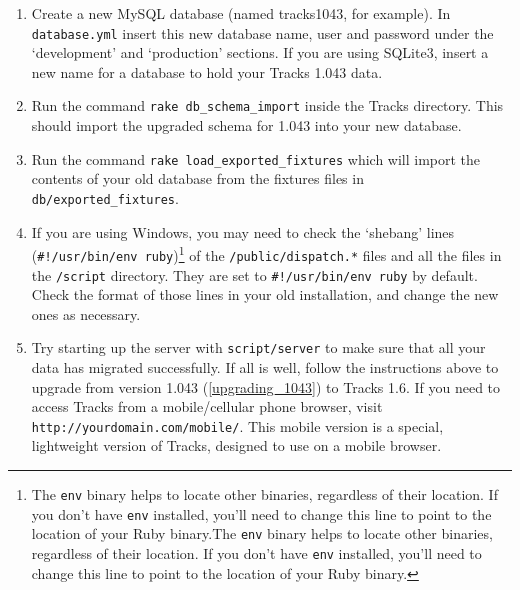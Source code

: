 \documentclass[10pt,twoside]{memoir}
\def\mybibliostyle{plain}
\def\bibliocommand{}
\begin{document}
\begin{enumerate}
\item Create a new MySQL database (named tracks1043, for example). In \texttt{database.yml} insert this new database name, user and password under the `development' and `production' sections. If you are using SQLite3, insert a new name for a database to hold your Tracks 1.043 data.

\item Run the command \texttt{rake db\_schema\_import} inside the Tracks directory. This should import the upgraded schema for 1.043 into your new database.

\item Run the command \texttt{rake load\_exported\_fixtures} which will import the contents of your old database from the fixtures files in \texttt{db/exported\_fixtures}.

\item If you are using Windows, you may need to check the `shebang' lines (\texttt{\#!/usr/bin/env ruby})\footnote{The \texttt{env} binary helps to locate other binaries, regardless of their location. If you don't have \texttt{env} installed, you'll need to change this line to point to the location of your Ruby binary.The \texttt{env} binary helps to locate other binaries, regardless of their location. If you don't have \texttt{env} installed, you'll need to change this line to point to the location of your Ruby binary.} of the \texttt{/public/dispatch.*} files and all the files in the \texttt{/script} directory. They are set to \texttt{\#!/usr/bin/env ruby} by default. Check the format of those lines in your old installation, and change the new ones as necessary.

\item Try starting up the server with \texttt{script/server} to make sure that all your data has migrated successfully. If all is well, follow the instructions above to upgrade from version 1.043 (\autoref{upgrading_1043}) to Tracks 1.6. If you need to access Tracks from a mobile/cellular phone browser, visit \texttt{http://yourdomain.com/mobile/}. This mobile version is a special, lightweight version of Tracks, designed to use on a mobile browser.
\end{enumerate}

%
%

\backmatter


\bibliocommand

\printglossary


\printindex
\end{document}
